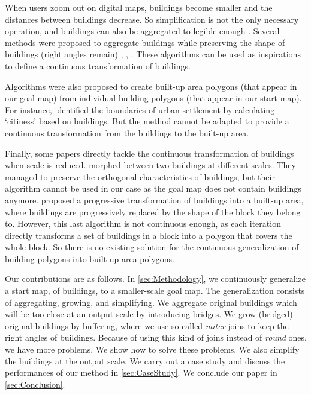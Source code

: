 When users zoom out on digital maps, 
buildings become smaller and the distances between buildings decrease. So 
simplification is not the only necessary operation, and buildings can also be 
aggregated to legible enough \cite{Weibel1997}. Several methods were proposed 
to aggregate buildings while preserving the shape of buildings (right angles 
remain) \cite{Regnauld2001}, \cite{RegnauldRevell07}, \cite{Damen2008}. These 
algorithms can be used as inspirations to define a continuous transformation of 
buildings.

Algorithms were also proposed to create built-up area polygons (that appear in 
our goal map) from individual building polygons (that appear in our start map). 
For instance, \citet{Chaudhry2008} identified the boundaries of urban 
settlement by calculating `citiness' based on buildings. But the method cannot 
be adapted to provide a continuous transformation from the buildings to the 
built-up area.

Finally, some papers directly tackle the continuous transformation of buildings 
when scale is reduced. \citet{Li2017_Building} morphed between two buildings at 
different scales.
They managed to preserve the orthogonal characteristics of buildings, but their 
algorithm cannot be used in our case as the goal map does not contain buildings 
anymore. \citet{Touya17b} proposed a progressive transformation of buildings 
into a built-up area, where buildings are progressively replaced by the shape 
of the block they belong to. However, this last algorithm is not continuous 
enough, as each iteration directly transforms a set of buildings in a block 
into a polygon that covers the whole block. So there is no existing solution 
for the continuous generalization of building polygons into built-up area 
polygons.


Our contributions are as follows.
In \sect\ref{sec:Methodology},
we continuously generalize a start map, of buildings, 
to a smaller-scale goal map.
The generalization consists of aggregating, growing, and simplifying.
We aggregate original buildings which will be too close at an output scale 
by introducing bridges.
We grow (bridged) original buildings by buffering,
where we use so-called \emph{miter} joins to keep the right angles of buildings.
Because of using this kind of joins instead of \emph{round} ones,
we have more problems.
We show how to solve these problems.
We also simplify the buildings at the output scale.
We carry out a case study 
and discuss the performances of our method in \sect\ref{sec:CaseStudy}.
We conclude our paper in \sect\ref{sec:Conclusion}.



